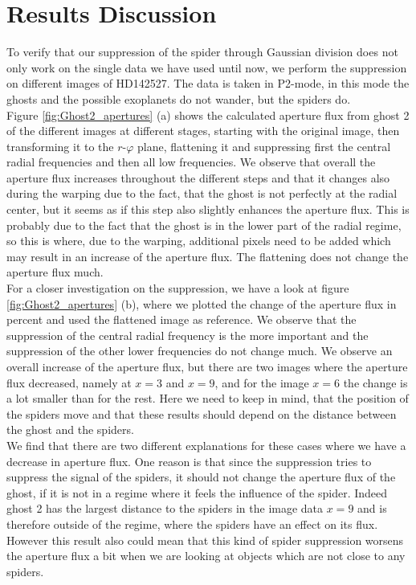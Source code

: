\section{Results Discussion}
To verify that our suppression of the spider through Gaussian division does not only work on the single data we have used until now, we perform the suppression on different images of HD142527. The data is taken in P2-mode, in this mode the ghosts and the possible exoplanets do not wander, but the spiders do. \\
Figure \ref{fig:Ghost2_apertures} (a) shows the calculated aperture flux from ghost 2 of the different images at different stages, starting with the original image, then transforming it to the $r$-$\varphi$ plane, flattening it and suppressing first the central radial frequencies and then all low frequencies. We observe that overall the aperture flux increases throughout the different steps and that it changes also during the warping due to the fact, that the ghost is not perfectly at the radial center, but it seems as if this step also slightly enhances the aperture flux. This is probably due to the fact that the ghost is in the lower part of the radial regime, so this is where, due to the warping, additional pixels need to be added which may result in an increase of the aperture flux. The flattening does not change the aperture flux much.\\
For a closer investigation on the suppression, we have a look at figure \ref{fig:Ghost2_apertures} (b), where we plotted the change of the aperture flux in percent and used the flattened image as reference. We observe that the suppression of the central radial frequency is the more important and the suppression of the other lower frequencies do not change much. We observe an overall increase of the aperture flux, but there are two images where the aperture flux decreased, namely at $x=3$ and $x=9$, and for the image $x=6$ the change is a lot smaller than for the rest. Here we need to keep in mind, that the position of the spiders move and that these results should depend on the distance between the ghost and the spiders. \\
We find that there are two different explanations for these cases where we have a decrease in aperture flux. One reason is that since the suppression tries to suppress the signal of the spiders, it should not change the aperture flux of the ghost, if it is not in a regime where it feels the influence of the spider. Indeed ghost 2 has the largest distance to the spiders in the image data $x=9$ and is therefore outside of the regime, where the spiders have an effect on its flux. However this result also could mean that this kind of spider suppression worsens the aperture flux a bit when we are looking at objects which are not close to any spiders.\\
